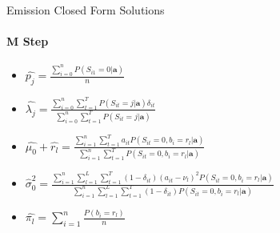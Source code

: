 \documentclass{beamer}
\begin{document}











\begin{frame}{Emission Closed Form Solutions}
\framesubtitle{M Step}
\begin{itemize}

    \item $\hat{p_j}  = \frac{\sum^n_{i=0} P(S_{i1}=0|\textbf{a})}{n}$
    
    \item $\hat{\lambda_j}  = \frac{\sum^n_{i=0} \sum_{t=1}^T P(S_{it}=j|\textbf{a})\delta_{it}}{\sum^n_{i=0} \sum_{t=1}^TP(S_{it}=j|\textbf{a})}$

    \item $\hat{\mu_0} +\hat{r_l} = \frac{\sum_{i=1}^n \sum_{t=1}^T a_{it}P(S_{it}=0,b_{i}=r_l|\textbf{a})}
    {\sum_{i=1}^n \sum_{t=1}^T P(S_{it}=0,b_{i}=r_l|\textbf{a})}$
    \item $\hat{\sigma}_0^2 = \frac{\sum_{i=1}^n \sum_{l=1}^L \sum_{t=1}^T (1-\delta_{it})(a_{it}-\nu_l)^2 P(S_{it}=0,b_{i}=r_l|\textbf{a})} {\sum_{i=1}^n \sum_{l=1}^L \sum_{t=1}^T (1-\delta_{it}) P(S_{it}=0,b_{i}=r_l|\textbf{a})}$
    \item $\hat{\pi_l} = \sum_{i = 1}^n \frac{P(b_i = r_l)}{n}$
\end{itemize} 

    
\end{frame}
\end{document}
